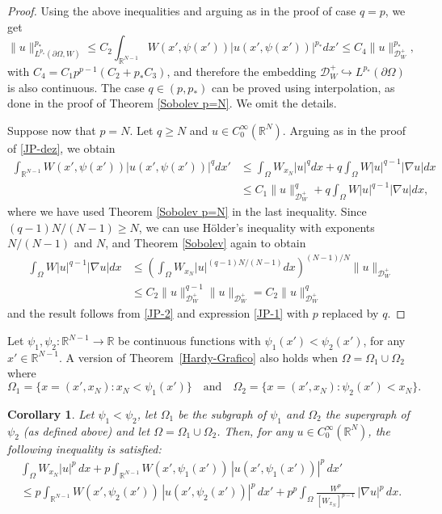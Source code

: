 \documentclass[12pt]{amsart}
\newtheorem{corollary}[theorem]{Corollary}
\theoremstyle{definition}
\theoremstyle{plain}
\newcommand{\dint}{\int_{\Omega}}
\begin{document}
\begin{proof}
        Using the above inequalities and arguing as in the proof of case $q=p$, we get
        $$
			\|u\|_{L^{p_*}(\partial\Omega,W)}^{p_*} \leq C_2\int_{\mathbb{R}^{N-1}} W(x',\psi(x'))|u(x',\psi(x'))|^{p_*} dx'  \leq C_4 \|u\|_{\mathcal{D}_W^+}^{p_*},
		$$
        with $C_4= C_1p^{p-1}(C_2+p_*C_3)$, 
        and therefore the embedding  $\mathcal{D}_W^+ \hookrightarrow L^{p_*}(\partial\Omega)$ is also continuous. The case $q \in (p,p_*)$ can be proved using interpolation,  as done in the proof of Theorem \ref{Sobolev p=N}. We omit the details.
        
          
          Suppose now that  $p=N$. Let $ q \geq N$ and $u \in C_0^\infty(\mathbb{R}^N)$. Arguing as in the proof of \eqref{JP-dez},  we obtain
		\begin{equation} \label{JP-2}
		    \begin{aligned}
		 \int_{\mathbb{R}^{N-1}}W(x',\psi(x'))|u(x',\psi(x'))|^qdx' & \leq \dint W_{x_N}|u|^qdx + q \dint W|u|^{q-1}|\nabla u|dx \\
         & \leq C_1\|u\|^q_{\mathcal{D}_W^+} + q \dint W|u|^{q-1}|\nabla u|dx, 
		\end{aligned}
        \end{equation}
        where we have used Theorem \ref{Sobolev p=N} in the last inequality.        Since $(q-1)N/(N-1)\geq N$, we can use 
        Hölder's inequality with exponents $N/(N-1)$ and $N$,  and Theorem \ref{Sobolev} again to obtain
        \begin{align*}
			\dint W|u|^{q-1}|\nabla u|dx & \leq  \left(\dint W_{x_N}|u|^{(q-1)N/(N-1)}dx\right)^{(N-1)/N} \|u\|_{\mathcal{D}_W^+} \\
            & \leq C_2 \|u\|_{\mathcal{D}_W^+}^{q-1} \|u\|_{\mathcal{D}_W^+} = C_2 \|u\|_{\mathcal{D}_W^+}^q
		\end{align*}
        and the result follows from \eqref{JP-2} and expression \eqref{JP-1} with $p$ replaced by $q$. 
        \end{proof}
	

Let $\psi_1, \psi_2 : \mathbb{R}^{N-1} \to \mathbb{R}$ be continuous functions 
with $\psi_1(x') < \psi_2(x')$, for any $x'\in\mathbb{R}^{N-1}$. A version of 
Theorem~\ref{Hardy-Grafico} also holds when $\Omega=\Omega_1 \cup \Omega_2$ where
\[
    \Omega_1 = \{ x = (x',x_N) : x_N < \psi_1(x')  \} \quad \text{and} \quad 
        \Omega_2 = \{ x = (x',x_N) :  \psi_2(x') < x_N \}.
\]
\begin{corollary} \label{fome1}
Let $\psi_1 <  \psi_2$, let $\Omega_1$ be the subgraph of $\psi_1$ and $\Omega_2$ 
the supergraph of $\psi_2$ (as defined above) and let $\Omega = \Omega_1 \cup
\Omega_2$. Then, for any $u \in C_0^\infty(\mathbb{R}^N)$, the following inequality is satisfied:
\begin{multline}\label{bora}
    \int_{\Omega} W_{x_N} |u|^p \, dx 
    + p \int_{\mathbb{R}^{N-1}} W(x',\psi_1(x'))\, |u(x',\psi_1(x'))|^p \, dx' \\[0.4em]
    \leq 
    p \int_{\mathbb{R}^{N-1}} W(x',\psi_2(x'))\, |u(x',\psi_2(x'))|^p \, dx'
    + p^p \int_{\Omega} \frac{W^p}{[W_{x_N}]^{p-1}}\, |\nabla u|^p \, dx.
\end{multline}
\end{corollary}
\end{document}
